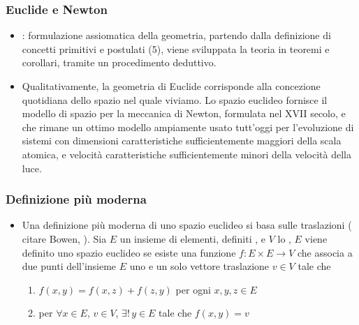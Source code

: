 \documentclass[letterpaper,10pt,italian]{jupyterBook}
\begin{document}
\subsubsection*{Euclide e Newton }
\begin{itemize}
\item {} 
\sphinxAtStartPar
{}: formulazione assiomatica della geometria, partendo dalla definizione di concetti primitivi e postulati (5), viene sviluppata la teoria in teoremi e corollari, tramite un procedimento deduttivo.

\item {} 
\sphinxAtStartPar
Qualitativamente, la geometria di Euclide corrisponde alla concezione quotidiana dello spazio nel quale viviamo. Lo spazio euclideo fornisce il modello di spazio per la meccanica di Newton, formulata nel XVII secolo, e che rimane un ottimo modello ampiamente usato tutt’oggi per l’evoluzione di sistemi con dimensioni caratteristiche sufficientemente maggiori della scala atomica, e velocità caratteristiche sufficientemente minori della velocità della luce.

\end{itemize}
\subsubsection*{Definizione più moderna}
\begin{itemize}
\item {} 
\sphinxAtStartPar
Una definizione più moderna di uno spazio euclideo si basa sulle traslazioni ( citare Bowen, ). Sia \(E\) un insieme di elementi, definiti , e \(V\) lo {\hyperref[\detokenize{ch/algebra/vector-algebra-def:math-hs-algebra-vector-def-examples}]{}}, \(E\) viene definito uno spazio euclideo se esiste una funzione \(f: E \times E \rightarrow V\) che associa a due punti dell’insieme \(E\) uno e un solo vettore traslazione \(v \in V\) tale che
\begin{enumerate}
%
\item {} 
\sphinxAtStartPar
\(f(x,y) = f(x,z) + f(z,y)\) per ogni \( x, y, z \in E\)

\item {} 
\sphinxAtStartPar
per \(\forall x \in E\), \(v \in V\), \(\exists ! \, y \in E\) tale che \(f(x,y) = v\)

\end{enumerate}

\end{itemize}
\end{document}

